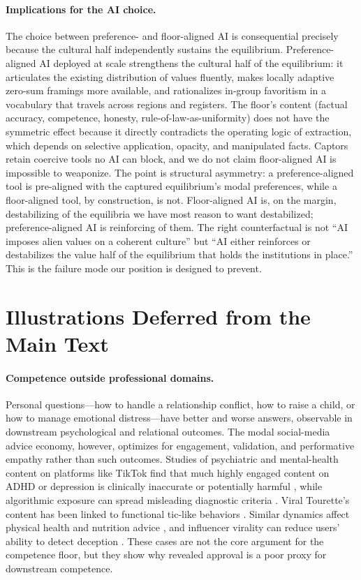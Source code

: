 \documentclass{article}
\theoremstyle{plain}
\theoremstyle{definition}
\theoremstyle{remark}
\begin{document}
\paragraph{Implications for the AI choice.} The choice between preference- and floor-aligned AI is consequential precisely because the cultural half independently sustains the equilibrium. Preference-aligned AI deployed at scale strengthens the cultural half of the equilibrium: it articulates the existing distribution of values fluently, makes locally adaptive zero-sum framings more available, and rationalizes in-group favoritism in a vocabulary that travels across regions and registers. The floor's content (factual accuracy, competence, honesty, rule-of-law-as-uniformity) does not have the symmetric effect because it directly contradicts the operating logic of extraction, which depends on selective application, opacity, and manipulated facts. Captors retain coercive tools no AI can block, and we do not claim floor-aligned AI is impossible to weaponize. The point is structural asymmetry: a preference-aligned tool is pre-aligned with the captured equilibrium's modal preferences, while a floor-aligned tool, by construction, is not. Floor-aligned AI is, on the margin, destabilizing of the equilibria we have most reason to want destabilized; preference-aligned AI is reinforcing of them. The right counterfactual is not ``AI imposes alien values on a coherent culture'' but ``AI either reinforces or destabilizes the value half of the equilibrium that holds the institutions in place.'' This is the failure mode our position is designed to prevent.

\section{Illustrations Deferred from the Main Text}
\label{app:moved-illustrations}

\paragraph{Competence outside professional domains.}
Personal questions---how to handle a relationship conflict, how to raise a child, or how to manage emotional distress---have better and worse answers, observable in downstream psychological and relational outcomes. The modal social-media advice economy, however, optimizes for engagement, validation, and performative empathy rather than such outcomes. Studies of psychiatric and mental-health content on platforms like TikTok find that much highly engaged content on ADHD or depression is clinically inaccurate or potentially harmful \citep{yeung2022tiktok, turuba2025tiktok}, while algorithmic exposure can spread misleading diagnostic criteria \citep{turuba2024exploring}. Viral Tourette's content has been linked to functional tic-like behaviors \citep{frey2022tiktok}. Similar dynamics affect physical health and nutrition advice \citep{zeng2025nutrition}, and influencer virality can reduce users' ability to detect deception \citep{mulcahy2024going}. These cases are not the core argument for the competence floor, but they show why revealed approval is a poor proxy for downstream competence.
\end{document}
